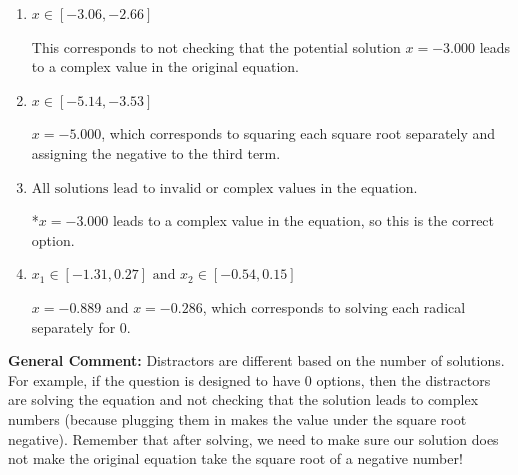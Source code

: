 \documentclass{extbook}[14pt]
\begin{document}
\begin{enumerate}
{\begin{enumerate}[label=\Alph*.]
$x = -3.000$ and $x = -0.889$, which corresponds to solving the equation correctly and including the value that makes the first square root 0.
\item \( x \in [-3.06,-2.66] \)

This corresponds to not checking that the potential solution $x = -3.000$ leads to a complex value in the original equation.
\item \( x \in [-5.14,-3.53] \)

$x = -5.000$, which corresponds to squaring each square root separately and assigning the negative to the third term.
\item \( \text{All solutions lead to invalid or complex values in the equation.} \)

*$x = -3.000$ leads to a complex value in the equation, so this is the correct option.
\item \( x_1 \in [-1.31, 0.27] \text{ and } x_2 \in [-0.54,0.15] \)

$x = -0.889$ and $x = -0.286$, which corresponds to solving each radical separately for 0.
\end{enumerate}

\textbf{General Comment:} Distractors are different based on the number of solutions. For example, if the question is designed to have 0 options, then the distractors are solving the equation and not checking that the solution leads to complex numbers (because plugging them in makes the value under the square root negative). Remember that after solving, we need to make sure our solution does not make the original equation take the square root of a negative number!
}
\end{enumerate}
\end{document}
